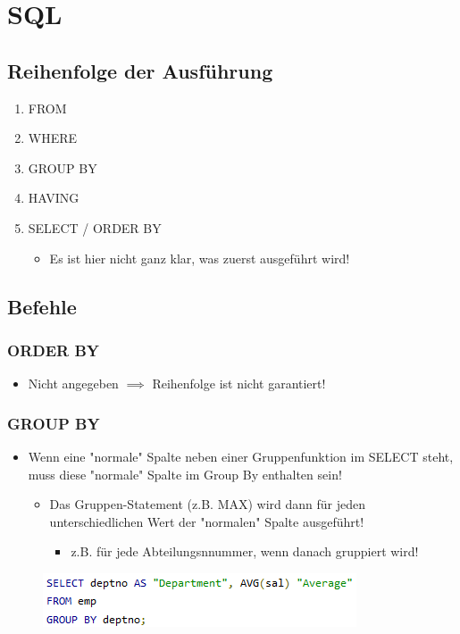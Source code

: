 \section{SQL}
\subsection{Reihenfolge der Ausführung}
\begin{enumerate}
    \item FROM
    \item WHERE
    \item GROUP BY
    \item HAVING
    \item SELECT / ORDER BY
    \begin{itemize}
        \item Es ist hier nicht ganz klar, was zuerst ausgeführt wird!
    \end{itemize}
\end{enumerate}

\subsection{Befehle}
\subsubsection{ORDER BY}
\begin{itemize}
    \item Nicht angegeben $\implies$ Reihenfolge ist nicht garantiert!
\end{itemize}

\subsubsection{GROUP BY}
\begin{itemize}
    \item Wenn eine "normale" Spalte neben einer Gruppenfunktion im SELECT steht, muss diese "normale" Spalte im Group By enthalten sein!
    \begin{itemize}
        \item Das Gruppen-Statement (z.B. MAX) wird dann für jeden unterschiedlichen Wert der "normalen" Spalte ausgeführt!
        \begin{itemize}
            \item z.B. für jede Abteilungsnnummer, wenn danach gruppiert wird!
        \end{itemize}
    \end{itemize}
\end{itemize}
\begin{figure}[ht!]
    \centering 
    \includegraphics[]{res/themenkorb_2/group_by.png}
\end{figure}

